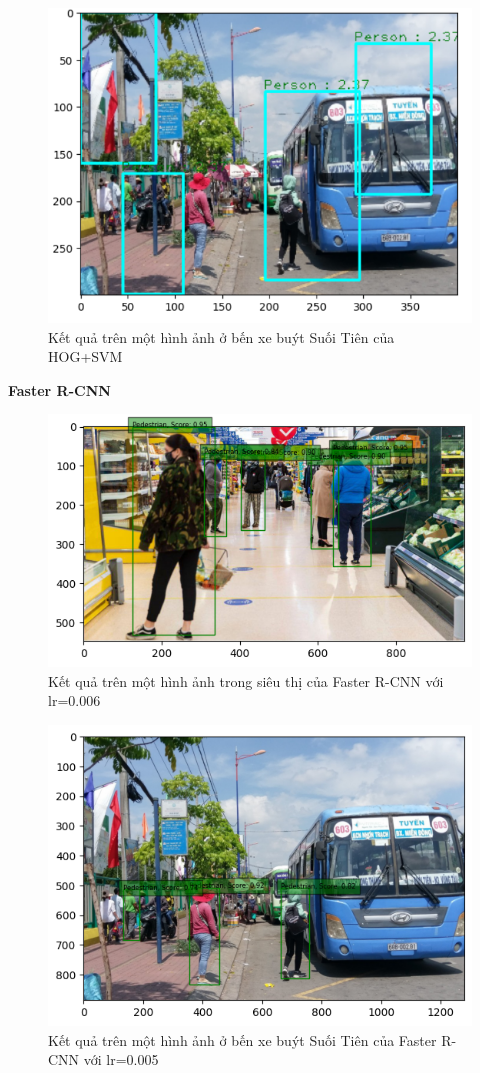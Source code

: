 \begin{figure}[h!]
  \centering
  \includegraphics[scale=0.55]{graphics/rshogsvm1.png}
  \caption{Kết quả trên một hình ảnh ở bến xe buýt Suối Tiên của HOG+SVM}
\end{figure}
\pagebreak

\textbf{Faster R-CNN}

\begin{figure}[h!]
  \centering
  \includegraphics[scale=0.7]{graphics/demo1.png}
  \caption{Kết quả trên một hình ảnh trong siêu thị của Faster R-CNN với lr=0.006}
\end{figure}

\begin{figure}[h!]
  \centering
  \includegraphics[scale=0.7]{graphics/demo2.png}
  \caption{Kết quả trên một hình ảnh ở bến xe buýt Suối Tiên của Faster R-CNN với lr=0.005}
\end{figure}